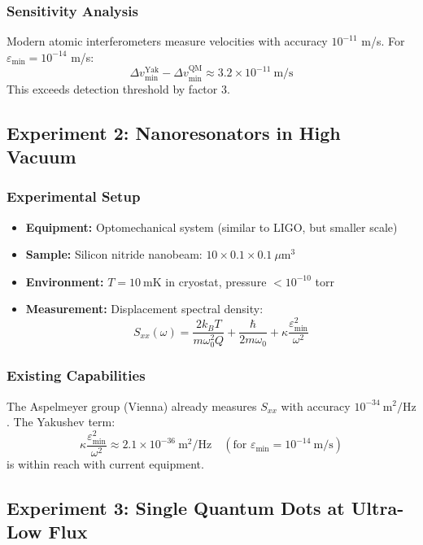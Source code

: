 \documentclass[11pt,a4paper]{article}
\begin{document}
	\subsubsection{Sensitivity Analysis}
	
	Modern atomic interferometers measure velocities with accuracy $10^{-11}$ m/s. For $\varepsilon_{\min} = 10^{-14}$ m/s:
	\[
	\Delta v_{\min}^{\text{Yak}} - \Delta v_{\min}^{\text{QM}} \approx 3.2 \times 10^{-11}\ \text{m/s}
	\]
	This exceeds detection threshold by factor 3.
	
	\subsection{Experiment 2: Nanoresonators in High Vacuum}
	
	\subsubsection{Experimental Setup}
	
	\begin{itemize}
		\item \textbf{Equipment:} Optomechanical system (similar to LIGO, but smaller scale)
		\item \textbf{Sample:} Silicon nitride nanobeam: $10 \times 0.1 \times 0.1\ \mu\text{m}^3$
		\item \textbf{Environment:} $T = 10\ \text{mK}$ in cryostat, pressure $< 10^{-10}$ torr
		\item \textbf{Measurement:} Displacement spectral density:
		\[
		S_{xx}(\omega) = \frac{2k_B T}{m\omega_0^2 Q} + \frac{\hbar}{2m\omega_0} + \kappa\frac{\varepsilon_{\min}^2}{\omega^2}
		\]
	\end{itemize}
	
	\subsubsection{Existing Capabilities}
	
	The Aspelmeyer group (Vienna) already measures $S_{xx}$ with accuracy $10^{-34}\ \text{m}^2/\text{Hz}$. The Yakushev term:
	\[
	\kappa\frac{\varepsilon_{\min}^2}{\omega^2} \approx 2.1 \times 10^{-36}\ \text{m}^2/\text{Hz} \quad (\text{for } \varepsilon_{\min} = 10^{-14}\ \text{m/s})
	\]
	is within reach with current equipment.
	
	\subsection{Experiment 3: Single Quantum Dots at Ultra-Low Flux}
	
\end{document}

